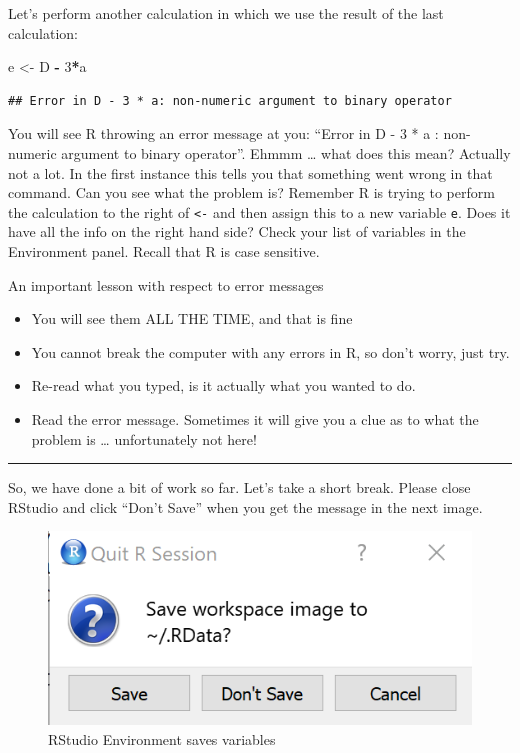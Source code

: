 \documentclass[
]{article}
\newenvironment{Shaded}{\begin{snugshade}}{\end{snugshade}}
\newcommand{\DecValTok}[1]{\textcolor[rgb]{0.00,0.00,0.81}{#1}}
\newcommand{\NormalTok}[1]{#1}
\newcommand{\OtherTok}[1]{\textcolor[rgb]{0.56,0.35,0.01}{#1}}
\newcommand{\SpecialCharTok}[1]{\textcolor[rgb]{0.81,0.36,0.00}{\textbf{#1}}}
\providecommand{\tightlist}{%
  \setlength{\itemsep}{0pt}\setlength{\parskip}{0pt}}
\begin{document}
Let's perform another calculation in which we use the result of the last
calculation:

\begin{Shaded}
\begin{Highlighting}[]
\NormalTok{e }\OtherTok{\textless{}{-}}\NormalTok{ D }\SpecialCharTok{{-}} \DecValTok{3}\SpecialCharTok{*}\NormalTok{a}
\end{Highlighting}
\end{Shaded}

\begin{verbatim}
## Error in D - 3 * a: non-numeric argument to binary operator
\end{verbatim}

You will see R throwing an error message at you: ``Error in D - 3 * a :
non-numeric argument to binary operator''. Ehmmm \ldots{} what does this
mean? Actually not a lot. In the first instance this tells you that
something went wrong in that command. Can you see what the problem is?
Remember R is trying to perform the calculation to the right of
\texttt{\textless{}-} and then assign this to a new variable \texttt{e}.
Does it have all the info on the right hand side? Check your list of
variables in the Environment panel. Recall that R is case sensitive.

An important lesson with respect to error messages

\begin{itemize}
\tightlist
\item
  You will see them ALL THE TIME, and that is fine
\item
  You cannot break the computer with any errors in R, so don't worry,
  just try.
\item
  Re-read what you typed, is it actually what you wanted to do.
\item
  Read the error message. Sometimes it will give you a clue as to what
  the problem is \ldots{} unfortunately not here!
\end{itemize}

\begin{center}\rule{0.5\linewidth}{0.5pt}\end{center}

So, we have done a bit of work so far. Let's take a short break. Please
close RStudio and click ``Don't Save'' when you get the message in the
next image.

\begin{figure}
\centering
\includegraphics{images/RStudio_SaveWorkspace.png}
\caption{RStudio Environment saves variables}
\end{figure}
\end{document}
